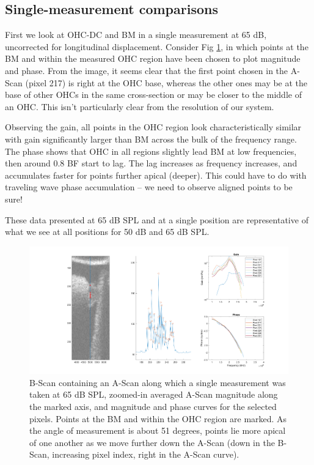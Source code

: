 \documentclass{article}
\begin{document}
\subsection{Single-measurement comparisons}
\par{First we look at OHC-DC and BM in a single measurement at 65 dB, uncorrected for longitudinal displacement. Consider Fig \ref{ohcdcp165db}, in which points at the BM and within the measured OHC region have been chosen to plot magnitude and phase. From the image, it seems clear that the first point chosen in the A-Scan (pixel 217) is right at the OHC base, whereas the other ones may be at the base of other OHCs in the same cross-section or may be closer to the middle of an OHC. This isn't particularly clear from the resolution of our system.}
\par{Observing the gain, all points in the OHC region look characteristically similar with gain significantly larger than BM across the bulk of the frequency range. The phase shows that OHC in all regions slightly lead BM at low frequencies, then around 0.8 BF start to lag. The lag increases as frequency increases, and accumulates faster for points further apical (deeper). This could have to do with traveling wave phase accumulation -- we need to observe aligned points to be sure!}
\par{These data presented at 65 dB SPL and at a single position are representative of what we see at all positions for 50 dB and 65 dB SPL.}

\begin{figure}
	\centering
	\includegraphics[width=\textwidth]{Figures/ohcdcp165dB.png}
	\caption{B-Scan containing an A-Scan along which a single measurement was taken at 65 dB SPL, zoomed-in averaged A-Scan magnitude along the marked axis, and magnitude and phase curves for the selected pixels. Points at the BM and within the OHC region are marked. As the angle of measurement is about 51 degrees, points lie more apical of one another as we move further down the A-Scan (down in the B-Scan, increasing pixel index, right in the A-Scan curve).}
	\label{ohcdcp165db}
\end{figure}
\end{document}
